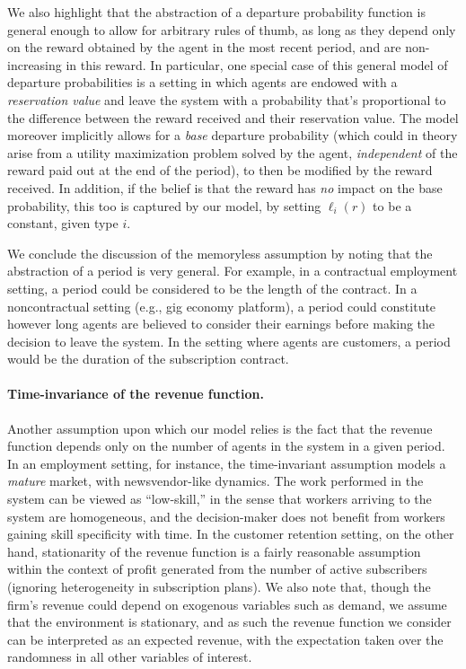 \documentclass[12pt]{article}
\begin{document}
We also highlight that the abstraction of a departure probability function is general enough to allow for arbitrary rules of thumb, as long as they depend only on the reward obtained by the agent in the most recent period, and are non-increasing in this reward. In particular, one special case of this general model of departure probabilities is a setting in which agents are endowed with a {\it reservation value} and leave the system with a probability that's proportional to the difference between the reward received and their reservation value. {The model moreover implicitly allows for a {\it base} departure probability (which could in theory arise from a utility maximization problem solved by the agent, {\it independent} of the reward paid out at the end of the period), to then be modified by the reward received. In addition, if the belief is that the reward has {\it no} impact on the base probability, this too is captured by our model, by setting $\ell_i(r)$ to be a constant, given type $i$.} 


We conclude the discussion of the memoryless assumption by noting that the abstraction of a period {is very general.} For example, in a contractual employment setting, a period could be considered to be the length of the contract. In a noncontractual setting (e.g., gig economy platform), a period could constitute however long agents are believed to consider their earnings before making the decision to leave the system. In the setting where agents are customers, a period would be the duration of the subscription contract.


\paragraph{Time-invariance of the revenue function.} Another assumption upon which our model relies is the fact that the revenue function depends only on the number of agents in the system in a given period. {In an employment setting, for instance,} the time-invariant assumption models a {\it mature} market, with newsvendor-like dynamics. The work performed in the system can be viewed as ``low-skill,'' in the sense that workers arriving to the system are homogeneous, and the decision-maker does not benefit from workers gaining skill specificity with time. In the customer retention setting, on the other hand, stationarity of the revenue function is a fairly reasonable assumption within the context of profit generated from the number of active subscribers (ignoring heterogeneity in subscription plans). We also note that, though the firm's revenue could depend on exogenous variables such as demand, we assume that the environment is stationary, and as such the revenue function we consider can be interpreted as an expected revenue, with the expectation taken over the randomness in all other variables of interest.
\end{document}
